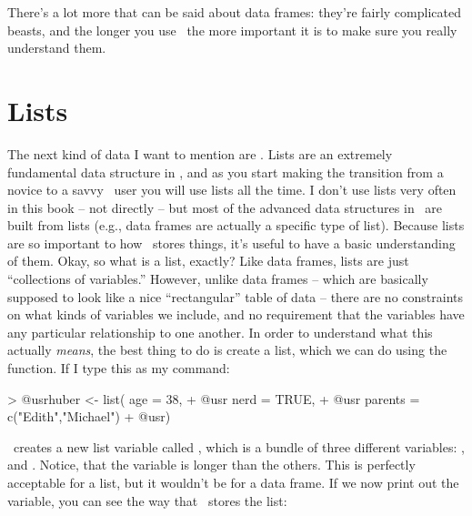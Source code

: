 
There's a lot more that can be said about data frames: they're fairly complicated beasts, and the longer you use \R\ the more important it is to make sure you really understand them. 

\section{Lists~\label{sec:lists}}

The next kind of data I want to mention are . Lists are an extremely fundamental data structure in \R, and as you start making the transition from a novice to a savvy \R\ user you will use lists all the time. I don't use lists very often in this book -- not directly -- but most of the advanced data structures in \R\ are built from lists (e.g., data frames are actually a specific type of list). Because lists are so important to how \R\ stores things, it's useful to have a basic understanding of them. Okay, so what is a list, exactly? Like data frames, lists are just ``collections of variables.'' However, unlike data frames -- which are basically supposed to look like a nice ``rectangular'' table of data -- there are no constraints on what kinds of variables we include, and no requirement that the variables have any particular relationship to one another. In order to understand what this actually {\it means}, the best thing to do is create a list, which we can do using the  function. If I type this as my command:
\begin{rblock1}
> @usr{huber <- list( age = 38,}
+ @usr{             nerd = TRUE,}
+ @usr{             parents = c("Edith","Michael") }
+ @usr{)}
\end{rblock1}
\R\ creates a new list variable called , which is a bundle of three different variables: ,  and . Notice, that the  variable is longer than the others. This is perfectly acceptable for a list, but it wouldn't be for a data frame. If we now print out the variable, you can see the way that \R\ stores the list:

